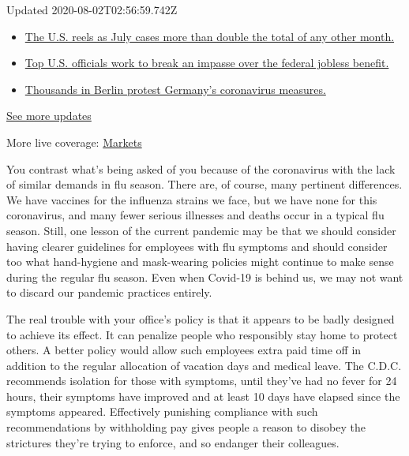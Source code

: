 Updated 2020-08-02T02:56:59.742Z

\begin{itemize}
\tightlist
\item
  \href{https://www.nytimes.com/2020/08/01/world/coronavirus-covid-19.html?action=click\&pgtype=Article\&state=default\&region=MAIN_CONTENT_1\&context=storylines_live_updates\#link-34047410}{The
  U.S. reels as July cases more than double the total of any other
  month.}
\item
  \href{https://www.nytimes.com/2020/08/01/world/coronavirus-covid-19.html?action=click\&pgtype=Article\&state=default\&region=MAIN_CONTENT_1\&context=storylines_live_updates\#link-780ec966}{Top
  U.S. officials work to break an impasse over the federal jobless
  benefit.}
\item
  \href{https://www.nytimes.com/2020/08/01/world/coronavirus-covid-19.html?action=click\&pgtype=Article\&state=default\&region=MAIN_CONTENT_1\&context=storylines_live_updates\#link-25930521}{Thousands
  in Berlin protest Germany's coronavirus measures.}
\end{itemize}

\href{https://www.nytimes.com/2020/08/01/world/coronavirus-covid-19.html?action=click\&pgtype=Article\&state=default\&region=MAIN_CONTENT_1\&context=storylines_live_updates}{See
more updates}

More live coverage:
\href{https://www.nytimes.com/live/2020/07/31/business/stock-market-today-coronavirus?action=click\&pgtype=Article\&state=default\&region=MAIN_CONTENT_1\&context=storylines_live_updates}{Markets}

You contrast what's being asked of you because of the coronavirus with
the lack of similar demands in flu season. There are, of course, many
pertinent differences. We have vaccines for the influenza strains we
face, but we have none for this coronavirus, and many fewer serious
illnesses and deaths occur in a typical flu season. Still, one lesson of
the current pandemic may be that we should consider having clearer
guidelines for employees with flu symptoms and should consider too what
hand-hygiene and mask-wearing policies might continue to make sense
during the regular flu season. Even when Covid-19 is behind us, we may
not want to discard our pandemic practices entirely.

The real trouble with your office's policy is that it appears to be
badly designed to achieve its effect. It can penalize people who
responsibly stay home to protect others. A better policy would allow
such employees extra paid time off in addition to the regular allocation
of vacation days and medical leave. The C.D.C. recommends isolation for
those with symptoms, until they've had no fever for 24 hours, their
symptoms have improved and at least 10 days have elapsed since the
symptoms appeared. Effectively punishing compliance with such
recommendations by withholding pay gives people a reason to disobey the
strictures they're trying to enforce, and so endanger their colleagues.


